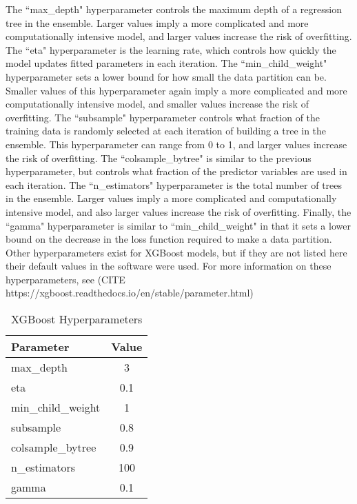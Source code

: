 The ``max\_depth" hyperparameter controls the maximum depth of a regression tree in the ensemble. Larger values imply a more complicated and more computationally intensive model, and larger values increase the risk of overfitting. The ``eta" hyperparameter is the learning rate, which controls how quickly the model updates fitted parameters in each iteration. The ``min\_child\_weight" hyperparameter sets a lower bound for how small the data partition can be. Smaller values of this hyperparameter again imply a more complicated and more computationally intensive model, and smaller values increase the risk of overfitting. The ``subsample" hyperparameter controls what fraction of the training data is randomly selected at each iteration of building a tree in the ensemble. This hyperparameter can range from 0 to 1, and larger values increase the risk of overfitting. The ``colsample\_bytree" is similar to the previous hyperparameter, but controls what fraction of the predictor variables are used in each iteration. The ``n\_estimators" hyperparameter is the total number of trees in the ensemble. Larger values imply a more complicated and computationally intensive model, and also larger values increase the risk of overfitting. Finally, the ``gamma" hyperparameter is similar to ``min\_child\_weight" in that it sets a lower bound on the decrease in the loss function required to make a data partition. Other hyperparameters exist for XGBoost models, but if they are not listed here their default values in the software were used. For more information on these hyperparameters, see (CITE https://xgboost.readthedocs.io/en/stable/parameter.html)

\begin{table}[ht]
\centering
\begin{tabular}{|l|c|}
\hline
\textbf{Parameter} & \textbf{Value} \\
\hline
max\_depth & 3 \\
eta & 0.1 \\
min\_child\_weight & 1 \\
subsample & 0.8 \\
colsample\_bytree & 0.9 \\
n\_estimators & 100 \\
gamma & 0.1 \\
\hline
\end{tabular}
\caption{XGBoost Hyperparameters}
\label{tab:xgb-params}
\end{table}

